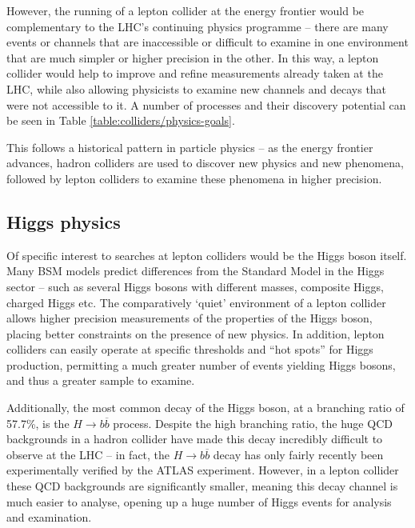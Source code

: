 However, the running of a lepton collider at the energy frontier would be complementary to the \acrshort{LHC}'s continuing physics programme -- there are many events or channels that are inaccessible or difficult to examine in one environment that are much simpler or higher precision in the other. In this way, a lepton collider would help to improve and refine measurements already taken at the \acrshort{LHC}, while also allowing physicists to examine new channels and decays that were not accessible to it. A number of processes and their discovery potential can be seen in Table \ref{table:colliders/physics-goals}.

This follows a historical pattern in particle physics -- as the energy frontier advances, hadron colliders are used to discover new physics and new phenomena, followed by lepton colliders to examine these phenomena in higher precision.

\subsection{Higgs physics}
Of specific interest to searches at lepton colliders would be the Higgs boson itself. Many \acrshort{BSM} models predict differences from the Standard Model in the Higgs sector -- such as several Higgs bosons with different masses, composite Higgs, charged Higgs etc. The comparatively `quiet' environment of a lepton collider allows higher precision measurements of the properties of the Higgs boson, placing better constraints on the presence of new physics. In addition, lepton colliders can easily operate at specific thresholds and ``hot spots'' for Higgs production, permitting a much greater number of events yielding Higgs bosons, and thus a greater sample to examine.

Additionally, the most common decay of the Higgs boson, at a branching ratio of 57.7\%, is the $H \rightarrow b \overline{b}$ process. Despite the high branching ratio, the huge \acrshort{QCD} backgrounds in a hadron collider have made this decay incredibly difficult to observe at the LHC -- in fact, the $H \rightarrow b \overline{b}$ decay has only fairly recently been experimentally verified by the \acrshort{ATLAS} experiment. However, in a lepton collider these \acrshort{QCD} backgrounds are significantly smaller, meaning this decay channel is much easier to analyse, opening up a huge number of Higgs events for analysis and examination.

